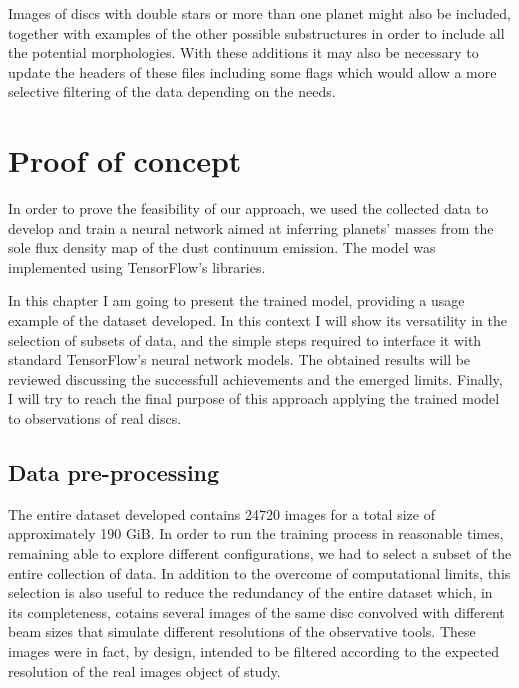 \documentclass[a4paper,10pt]{report}
\begin{document}
Images of discs with double stars or more than one planet might also be included, together with examples
of the other possible substructures in order to include all the potential morphologies.
With these additions it may also be necessary to update the headers of these files including some flags which would allow 
a more selective filtering of the data depending on the needs.

\chapter{Proof of concept}

In order to prove the feasibility of our approach, we used the collected data to develop and train a neural network
aimed at inferring planets' masses from the sole flux density map of the dust continuum emission.
The model was implemented using TensorFlow's libraries.

In this chapter I am going to present the trained model, providing a usage example of
the dataset developed. In this context I will show its versatility in the selection 
of subsets of data, and the simple 
steps required to interface it with standard TensorFlow's neural network models.
The obtained results will be reviewed discussing the successfull achievements and the emerged limits.
Finally, I will try to reach the final purpose of this approach applying the trained
model to observations of real discs.

\section{Data pre-processing}

The entire dataset developed contains 24720 images for a total size of approximately 190 GiB.
In order to run the training process in reasonable times, remaining able to explore different configurations, we 
had to select a subset of the entire collection of data. In addition to the overcome of computational limits, 
this selection is also useful to reduce the redundancy of the entire dataset which, in its completeness, cotains
several images of the same disc convolved with different beam sizes
that simulate different resolutions of the observative tools.
These images were in fact, by design, intended to be filtered according to the expected resolution of the real
images object of study.
\end{document}
